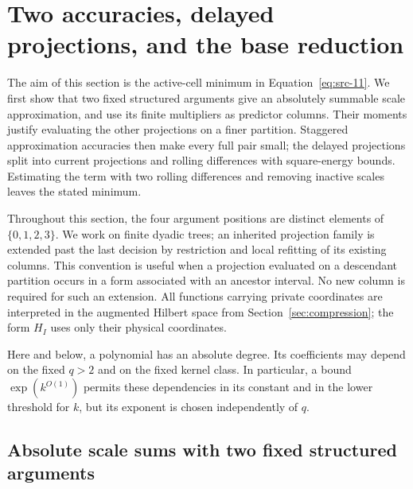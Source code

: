 \section{Two accuracies, delayed projections, and the base reduction}
\label{sec:base}

The aim of this section is the active-cell minimum in
Equation~\eqref{eq:src-11}.  We first show that two fixed structured arguments
give an absolutely summable scale approximation, and use its finite
multipliers as predictor columns.  Their moments justify evaluating the
other projections on a finer partition.  Staggered approximation
accuracies then make every full pair small; the delayed projections
split into current projections and rolling differences with
square-energy bounds.  Estimating the term with two rolling differences
and removing inactive scales leaves the stated minimum.

Throughout this section, the four argument positions are distinct elements of
$\{0,1,2,3\}$.  We work on finite dyadic trees; an inherited projection family
is extended past the last decision by restriction and local refitting of its
existing columns.  This convention is useful when a projection evaluated on a
descendant partition occurs in a form associated with an ancestor interval.
No new column is required for such an extension.  All functions carrying
private coordinates are interpreted in the augmented Hilbert space from
Section~\ref{sec:compression}; the form $H_I$ uses only their physical
coordinates.

Here and below, a polynomial has an absolute degree.  Its coefficients may
depend on the fixed $q>2$ and on the fixed kernel class.  In particular, a
bound $\exp(k^{O(1)})$ permits these dependencies in its constant and in the
lower threshold for $k$, but its exponent is chosen independently of $q$.

\subsection{Absolute scale sums with two fixed structured arguments}

